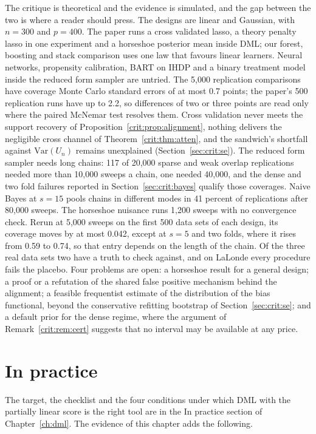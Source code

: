 The critique is theoretical and the evidence is simulated, and the gap between the two is where a reader should press. The designs are linear and Gaussian, with $n = 300$ and $p = 400$. The paper runs a cross validated lasso, a theory penalty lasso in one experiment and a horseshoe posterior mean inside DML; our forest, boosting and stack comparison uses one law that favours linear learners. Neural networks, propensity calibration, BART on IHDP and a binary treatment model inside the reduced form sampler are untried. The 5,000 replication comparisons have coverage Monte Carlo standard errors of at most 0.7 points; the paper's 500 replication runs have up to 2.2, so differences of two or three points are read only where the paired McNemar test resolves them. Cross validation never meets the support recovery of Proposition~\ref{crit:prop:alignment}, nothing delivers the negligible cross channel of Theorem~\ref{crit:thm:atten}, and the sandwich's shortfall against $\mathrm{Var}(U_n)$ remains unexplained (Section~\ref{sec:crit:se}). The reduced form sampler needs long chains: 117 of 20,000 sparse and weak overlap replications needed more than 10,000 sweeps a chain, one needed 40,000, and the dense and two fold failures reported in Section~\ref{sec:crit:bayes} qualify those coverages. Naive Bayes at $s = 15$ pools chains in different modes in 41 percent of replications after 80,000 sweeps. The horseshoe nuisance runs 1,200 sweeps with no convergence check. Rerun at 5,000 sweeps on the first 500 data sets of each design, its coverage moves by at most 0.042, except at $s = 5$ and two folds, where it rises from 0.59 to 0.74, so that entry depends on the length of the chain. Of the three real data sets two have a truth to check against, and on LaLonde every procedure fails the placebo. Four problems are open: a horseshoe result for a general design; a proof or a refutation of the shared false positive mechanism behind the alignment; a feasible frequentist estimate of the distribution of the bias functional, beyond the conservative refitting bootstrap of Section~\ref{sec:crit:se}; and a default prior for the dense regime, where the argument of Remark~\ref{crit:rem:cert} suggests that no interval may be available at any price.

\section{In practice}\label{sec:crit:practice}

The target, the checklist and the four conditions under which DML with the partially linear score is the right tool are in the In practice section of Chapter~\ref{ch:dml}. The evidence of this chapter adds the following.

